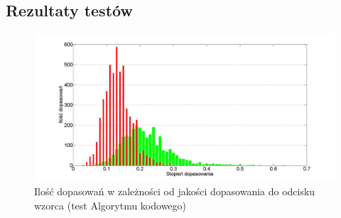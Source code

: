 \subsection{Rezultaty testów}
\begin{figure}[!hb]
    \begin{center}
		\includegraphics[angle=0,scale=0.27]{img/pattern_bar_statistic_analyses_code_way.jpg}
		\caption{Ilość dopasowań w zależności od jakości dopasowania do odcisku wzorca (test Algorytmu kodowego)}
		\label{img:code_stat_bar_pattern}
    \end{center}
\end{figure} 
